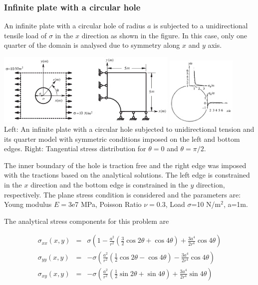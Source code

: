 \subsubsection{Infinite plate with a circular hole \cite{rama16}}
\mscthesis {}

An infinite plate with a circular hole of radius $a$ 
is subjected to a unidirectional tensile load of $\sigma$ in the $x$ direction as shown
in the figure. In this case, only one quarter of the domain is analysed due
to symmetry along $x$ and $y$ axis. 

\begin{center}
\includegraphics[width=0.65\textwidth]{images/benchmark_hole/yobu02}
\includegraphics[width=0.25\textwidth]{images/benchmark_hole/yobu02b}\\
{\captionfont Left: An infinite plate with a circular hole subjected to unidirectional tension 
and its quarter model with symmetric conditions imposed on the left and bottom edges.
Right: Tangential stress distribution for $\theta=0$  and $\theta=\pi/2$. \cite{yobu02}}
\end{center}

The inner boundary of the hole is traction free and the right edge was
imposed with the tractions based on the analytical solutions.
The left edge is constrained in the $x$ direction and the bottom
edge is constrained in the $y$ direction, respectively. The plane stress
condition is considered and the parameters are: 
Young modulus $E=$3e7 MPa, Poisson Ratio $\nu=$0.3, Load $\sigma$=10 N/m$^2$, a=1m.

The analytical stress components for this
problem are 

\begin{eqnarray}
\sigma_{xx}(x,y) &=& \sigma \left(  1-\frac{a^2}{r^2}\left(\frac{3}{2}\cos 2\theta + \cos 4\theta \right) 
+ \frac{3a^4}{2r^4} \cos 4\theta \right) \\
\sigma_{yy}(x,y) &=& -\sigma \left( \frac{a^2}{r^2} \left(\frac{1}{2}\cos 2\theta - \cos 4\theta \right) 
- \frac{3a^4}{2r^4} \cos 4\theta \right) \\
\sigma_{xy}(x,y) &=& -\sigma \left( \frac{a^2}{r^2} \left(\frac{1}{2}\sin 2\theta + \sin 4\theta\right) 
+ \frac{3a^4}{2r^4} \sin 4\theta \right) 
\end{eqnarray}

